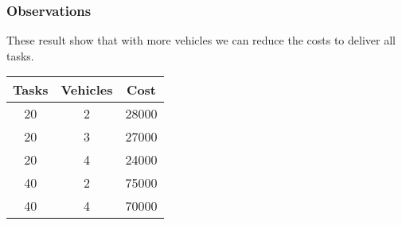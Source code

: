 \documentclass[11pt]{article}
\begin{document}
\subsubsection{Observations}
These result show that with more vehicles we can reduce the costs to deliver all tasks.

\begin{tabular}{ |c|c|c| } 
 \hline
 Tasks & Vehicles & Cost \\ 
 \hline
 20 & 2 & 28000 \\ 
 20 & 3 & 27000 \\ 
 20 & 4 & 24000 \\ 
 40 & 2 & 75000 \\ 
 40 & 4 & 70000 \\ 
 \hline
\end{tabular}
\end{document}
